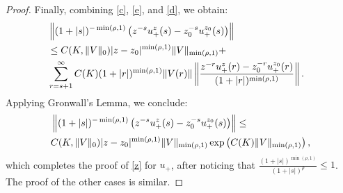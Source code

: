 \documentclass[12pt,oneside,onecolumn,open]{article}
\begin{document}
\begin{proof}
    Finally, combining \eqref{c}, \eqref{e}, and \eqref{d}, we obtain:
    \begin{align}
        &\left\| (1+|s|)^{-\min(\rho, 1 )} \left( z^{-s} u_{+}^{z}(s) - z_{0}^{-s} u_{+}^{z_{0}}(s) \right) \right\| \\
        \notag &\leq C(K, \| V \|_0 ) |z - z_0|^{\min(\rho, 1 )} \| V \|_{\min(\rho, 1 )} +& \\\notag  &\sum_{r=s+1}^{\infty} C(K)(1 + |r|)^{\min(\rho, 1 )} \| V(r) \| \left\| \frac{z^{-r} u_{+}^{z}(r) - z_{0}^{-r} u_{+}^{z_{0}}(r)}{(1+|r|)^{\min(\rho, 1 )}} \right\|.
    \end{align}
    Applying Gronwall's Lemma, we conclude:
    \begin{align}
        &\left\| (1+|s|)^{-\min(\rho, 1 )} \left( z^{-s} u_{+}^{z}(s) - z_{0}^{-s} u_{+}^{z_{0}}(s) \right) \right\| \leq \\ &\notag C(K, \| V \|_0  ) |z - z_0|^{\min(\rho, 1 )} \| V \|_{\min(\rho, 1 )} \exp \left( C(K)   \| V  \|_{\min(\rho, 1 ) } \right),
    \end{align}
    which completes the proof of \eqref{z} for $ u_+ $, after noticing that $  \frac{(1 + |s|)^{\min(\rho, 1 )}}{   (1 + |s|)^{\rho }} \leq 1   $. The proof of the other cases  is similar.
\end{proof}
\end{document}
